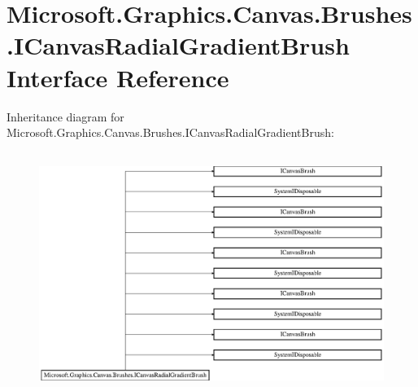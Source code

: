 \hypertarget{interface_microsoft_1_1_graphics_1_1_canvas_1_1_brushes_1_1_i_canvas_radial_gradient_brush}{}\section{Microsoft.\+Graphics.\+Canvas.\+Brushes.\+I\+Canvas\+Radial\+Gradient\+Brush Interface Reference}
\label{interface_microsoft_1_1_graphics_1_1_canvas_1_1_brushes_1_1_i_canvas_radial_gradient_brush}
Inheritance diagram for Microsoft.\+Graphics.\+Canvas.\+Brushes.\+I\+Canvas\+Radial\+Gradient\+Brush\+:\begin{figure}[H]
\begin{center}
\leavevmode
\includegraphics[height=7.877238cm]{interface_microsoft_1_1_graphics_1_1_canvas_1_1_brushes_1_1_i_canvas_radial_gradient_brush}
\end{center}
\end{figure}
